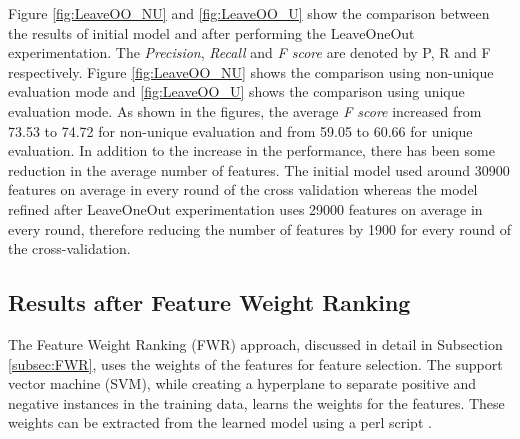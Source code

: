 Figure \ref{fig:LeaveOO_NU} and \ref{fig:LeaveOO_U} show the comparison between the results of initial model and after performing the LeaveOneOut experimentation.  The \textit{Precision}, \textit{Recall} and \textit{F score} are denoted by P, R and F respectively. Figure \ref{fig:LeaveOO_NU} shows the comparison using non-unique evaluation mode and \ref{fig:LeaveOO_U} shows the comparison using unique evaluation mode. As shown in the figures, the average \textit{F score} increased from 73.53 to 74.72 for non-unique evaluation and from 59.05 to 60.66 for unique evaluation. In addition to the increase in the performance, there has been some reduction in the average number of features. The initial model used around 30900 features on average in every round of the cross validation whereas the model refined after LeaveOneOut experimentation uses 29000 features on average in every round, therefore reducing the number of features by 1900 for every round of the cross-validation.

\subsection{Results after Feature Weight Ranking}

The Feature Weight Ranking (FWR) approach, discussed in detail in Subsection \ref{subsec:FWR}, uses the weights of the features for feature selection. The support vector machine (SVM), while creating a hyperplane to separate positive and negative instances in the training data, learns the weights for the features. These weights can be extracted from the learned model using a perl script \cite{svmlightonline}. 


